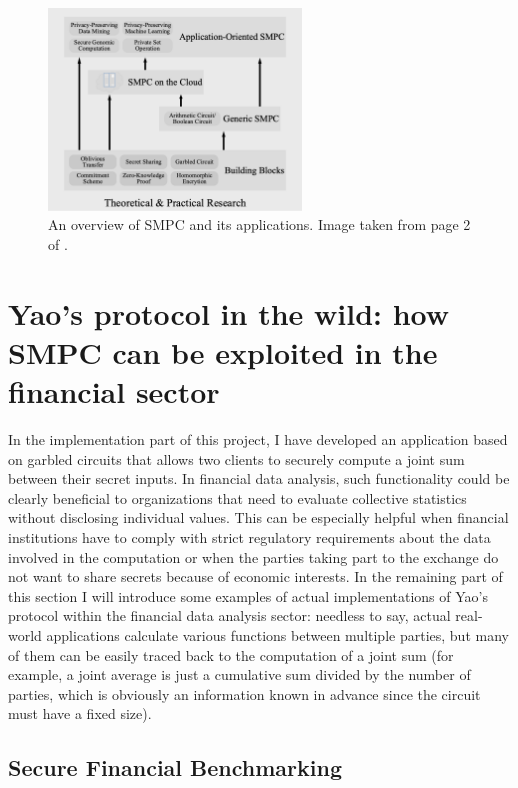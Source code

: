 \documentclass[12pt]{article}
\begin{document}
\begin{figure}[h]
    \centering
    \includegraphics[width=0.6\textwidth]{practicalapplications.png}
    \caption{An overview of SMPC and its applications. Image taken from page 2 of \cite{Applications}.}\label{fig:applications}
\end{figure}

\section{Yao's protocol in the wild: how SMPC can be exploited in the financial sector}\label{sec:applications}

In the implementation part of this project, I have developed an application based on garbled circuits that allows two clients to securely compute a joint sum between their secret inputs. In financial data analysis, such functionality could be clearly beneficial to organizations that need to evaluate collective statistics without disclosing individual values. This can be especially helpful when financial institutions have to comply with strict regulatory requirements about the data involved in the computation or when the parties taking part to the exchange do not want to share secrets because of economic interests. In the remaining part of this section I will introduce some examples of actual implementations of Yao's protocol within the financial data analysis sector: needless to say, actual real-world applications calculate various functions between multiple parties, but many of them can be easily traced back to the computation of a joint sum (for example, a joint average is just a cumulative sum divided by the number of parties, which is obviously an information known in advance since the circuit must have a fixed size).

\subsection{Secure Financial Benchmarking}
\end{document}
